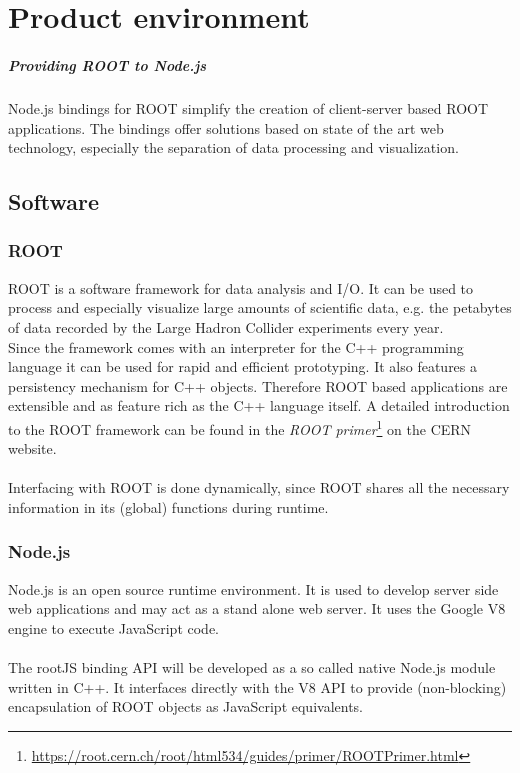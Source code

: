 \chapter{Product environment}

\paragraph{Providing ROOT to Node.js}
\noindent Node.js bindings for ROOT simplify the creation of client-server based ROOT applications. The bindings offer solutions based on state of the art web technology, especially the separation of data processing and visualization.\\

\section{Software}
\subsection{ROOT}

ROOT is a software framework for data analysis and I/O. It can be used to process and especially visualize large amounts of scientific data, e.g. the petabytes of data recorded by the Large Hadron Collider experiments every year.\\
Since the framework comes with an interpreter for the C++ programming language it can be used for rapid and efficient prototyping. It also features a persistency mechanism for C++ objects. Therefore ROOT based applications are extensible and as feature rich as the C++ language itself.
A detailed introduction to the ROOT framework can be found in the \textit{ROOT  primer}\footnote[1]{\url{https://root.cern.ch/root/html534/guides/primer/ROOTPrimer.html}}
on the CERN website. \\ \\
Interfacing with ROOT is done dynamically, since ROOT shares all the necessary information in its (global) functions during runtime.

\subsection{Node.js}

Node.js is an open source runtime environment. It is used to develop server side web applications and may act as a stand alone web server. It uses the Google V8 engine to execute JavaScript code. \\ \\
The rootJS binding API will be developed as a so called native Node.js module written in C++. It interfaces directly with the V8 API to provide (non-blocking) encapsulation of ROOT objects as JavaScript equivalents.

